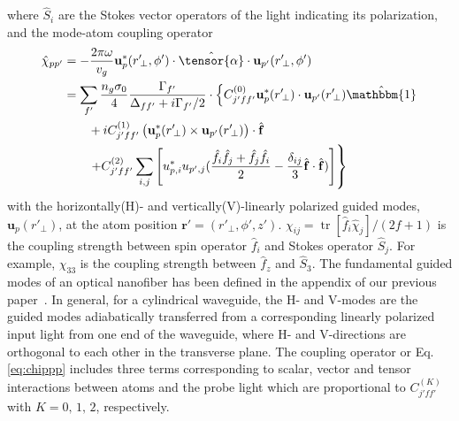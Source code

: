 \documentclass[preprint,aps,pra,onecolumn,superscriptaddress]{revtex4-1} %
\DeclareMathOperator{\tr}{tr}
\def\br{\mathbf{r}}
\newcommand{\nn}{\nonumber}
\begin{document}
where $ \hat{S}_i $ are the Stokes vector operators of the light indicating its polarization, and the mode-atom coupling operator
\begin{align}
\hat{\chi}_{pp'} 
&=-\frac{2\pi \omega}{v_g}\mathbf{u}_{p}^*(r'\!_\perp,\phi')\cdot \hat{\tensor{\alpha}}\cdot \mathbf{u}_{p'}(r'\!_\perp,\phi')\\
&= \sum_{f'} \frac{n_g\sigma_0}{4}\frac{\Gamma_{f'}}{\Delta_{ff'}+i\Gamma_{f'}/2}\cdot \left\{ C_{j'ff'}^{(0)}\mathbf{u}_p^*(r'\!_\perp)\cdot \mathbf{u}_{p'}(r'\!_\perp)\hat{\mathbbm{1}}\right.\nn\\
&\quad\quad +iC_{j'ff'}^{(1)}\left(\mathbf{u}_p^*(r'\!_\perp)\times\mathbf{u}_{p'}(r'\!_\perp) \right)\cdot \hat{\mathbf{f}} \nonumber\\
&\quad\quad\left. + C_{j'ff'}^{(2)}\sum_{i,j}\left[u^*_{p,i}u_{p',j}(\frac{\hat{f}_i\hat{f}_j+\hat{f}_j\hat{f}_i}{2}-\frac{\delta_{ij}}{3}\hat{\mathbf{f}}\cdot\hat{\mathbf{f}}) \right]\right\}
\label{eq:chippp}
\end{align}
with the horizontally(H)- and vertically(V)-linearly polarized guided modes, $ \mathbf{u}_p(r'\!_\perp) $, at the atom position $ \br'=(r'\!_\perp,\phi',z') $. 
$ \chi_{ij}=\tr[\hat{f}_i\hat{\chi}_j]/(2f+1) $ is the coupling strength between spin operator $ \hat{f}_i $ and Stokes operator $ \hat{S}_j $. 
For example, $ \chi_{33} $ is the coupling strength between $ \hat{f}_z $ and $ \hat{S}_3 $.
The fundamental guided modes of an optical nanofiber has been defined in the appendix of our previous paper~\cite{Qi2016}. 
In general, for a cylindrical waveguide, the H- and V-modes are the guided modes adiabatically transferred from a corresponding linearly polarized input light from one end of the waveguide, where H- and V-directions are orthogonal to each other in the transverse plane.
The coupling operator or Eq.\eqref{eq:chippp} includes three terms corresponding to scalar, vector and tensor interactions between atoms and the probe light which are proportional to $ C_{j'ff'}^{(K)} $ with $ K=0,\,1,\,2 $, respectively.
\end{document}
